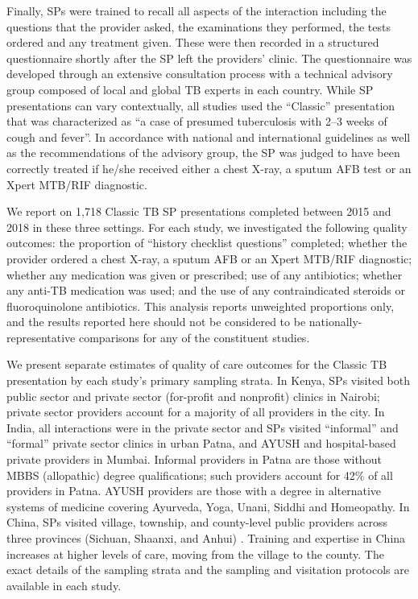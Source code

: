 \documentclass[fleqn,10pt]{wlscirep}
\begin{document}
Finally, SPs were trained to recall all aspects of the interaction including the questions that the provider asked, the examinations they performed, the tests ordered and any treatment given. These were then recorded in a structured questionnaire shortly after the SP left the providers' clinic. The questionnaire was developed through an extensive consultation process with a technical advisory group composed of local and global TB experts in each country. While SP presentations can vary contextually, all studies used the ``Classic'' presentation that was characterized as ``a case of presumed tuberculosis with 2–3 weeks of cough and fever''. In accordance with national and international guidelines as well as the recommendations of the advisory group, the SP was judged to have been correctly treated if he/she received either a chest X-ray, a sputum AFB test or an Xpert MTB/RIF diagnostic. 

We report on 1,718 Classic TB SP presentations completed between 2015 and 2018 in these three settings. For each study, we investigated the following quality outcomes: the proportion of ``history checklist questions'' completed; whether the provider ordered a chest X-ray, a sputum AFB  or an Xpert MTB/RIF diagnostic; whether any medication was given or prescribed; use of any antibiotics; whether any anti-TB medication was used; and the use of any contraindicated steroids or fluoroquinolone antibiotics. This analysis reports unweighted proportions only, and the results reported here should not be considered to be nationally-representative comparisons for any of the constituent studies.

We present separate estimates of quality of care outcomes for the Classic TB presentation by each study's primary sampling strata. In Kenya, SPs visited both public sector and private sector (for-profit and nonprofit) clinics in Nairobi; private sector providers account for a majority of all providers in the city. In India, all interactions were in the private sector and SPs visited ``informal'' and ``formal'' private sector clinics in urban Patna, and AYUSH and hospital-based private providers in Mumbai. Informal providers in Patna are those without MBBS (allopathic) degree qualifications; such providers account for 42\% of all providers in Patna. AYUSH providers are those with a degree in alternative systems of medicine covering Ayurveda, Yoga, Unani, Siddhi and Homeopathy. In China, SPs visited village, township, and county-level public providers across three provinces (Sichuan, Shaanxi, and Anhui) . Training and expertise in China increases at higher levels of care, moving from the village to the county. The exact details of the sampling strata and the sampling and visitation protocols are available in each study. 
\end{document}
